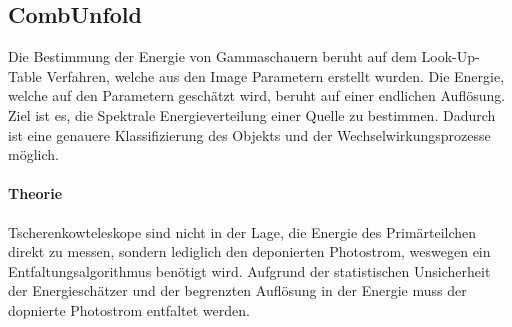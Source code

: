 \subsection{CombUnfold}%
\label{sub:combunfold}
Die Bestimmung der Energie von Gammaschauern beruht auf dem Look-Up-Table
Verfahren,
welche aus den Image Parametern erstellt wurden.
Die Energie, welche auf den Parametern geschätzt wird, beruht auf einer
endlichen Auflösung.
Ziel ist es, die Spektrale Energieverteilung einer Quelle zu bestimmen.
Dadurch ist eine genauere Klassifizierung des Objekts und der
Wechselwirkungsprozesse möglich.

\paragraph{Theorie}%
\label{par:theorie}

Tscherenkowteleskope sind nicht in der Lage, die Energie
des Primärteilchen direkt zu messen,
sondern lediglich den deponierten Photostrom,
weswegen ein Entfaltungsalgorithmus benötigt wird.
Aufgrund der statistischen Unsicherheit der Energieschätzer und der begrenzten
Auflösung in der Energie muss der dopnierte Photostrom entfaltet werden.




